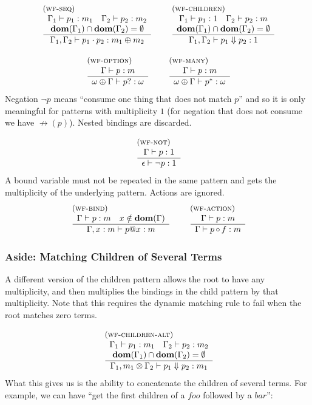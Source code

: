 \documentclass{article}
\makeatletter
\newcommand{\rulename}{\textsc}
\newcommand{\irule}[3]{\begin{array}{l}{~\small\mbox{(\rulename{#1})}}\\\;\frac{\begin{array}{c}#2\end{array}}{\begin{array}{l}#3\end{array}}\end{array}}
\newcommand{\wfp}[3]{\ensuremath{#1 \vdash #2 : #3}}
\newcommand{\pseq}[2]{\ensuremath{#1 \cdot #2}}
\newcommand{\children}[2]{\ensuremath{#1} \Downarrow #2}
\newcommand{\pnot}[1]{\ensuremath{\lnot #1}}
\newcommand{\maybe}[1]{\ensuremath{#1?}}
\newcommand{\many}[1]{\ensuremath{#1^*}}
\newcommand{\bind}[2]{\ensuremath{#1@#2}}
\newcommand{\paction}[2]{\ensuremath{#1\mathop{\circ} #2}}
\newcommand{\nfb}[1]{\ensuremath{\mathop{\not\rightarrow}(#1)}}
\makeatother
\begin{document}
\[
  \begin{array}{c}
    \irule{wf-seq}{
    \wfp{\Gamma_1}{p_1}{m_1}\quad
    \wfp{\Gamma_2}{p_2}{m_2}\\
    \mathbf{dom}(\Gamma_1) \cap \mathbf{dom}(\Gamma_2) = \emptyset
    }{
    \wfp{\Gamma_1, \Gamma_2}{\pseq{p_1}{p_2}}{m_1\oplus m_2}
    }
    \quad
    \irule{wf-children}{
    \wfp{\Gamma_1}{p_1}{1}
    \quad
    \wfp{\Gamma_2}{p_2}{m}\\
    \mathbf{dom}(\Gamma_1) \cap \mathbf{dom}(\Gamma_2) = \emptyset
    }{
    \wfp{\Gamma_1, \Gamma_2}{\children{p_1}{p_2}}{1}
    }
    \\\\
    \irule{wf-option}{
    \wfp{\Gamma}{p}{m}
    }{
    \wfp{\omega \oplus \Gamma}{\maybe{p}}{\omega}
    }
    \quad
    \irule{wf-many}{
    \wfp{\Gamma}{p}{m}
    }{
    \wfp{\omega \oplus \Gamma}{\many{p}}{\omega}
    }
  \end{array}
\]
%
Negation \pnot{p} means ``consume one thing that does not match
$p$'' and so it is only meaningful for patterns with multiplicity
$1$ (for negation that does not consume we have \nfb{p}). Nested
bindings are discarded.

\[
  \begin{array}{c}
    \irule{wf-not}{
    \wfp{\Gamma}{p}{1}
    }{
    \wfp{\epsilon}{\pnot{p}}{1}
    }
  \end{array}
\]
%
A bound variable must not be repeated in the same pattern and gets
the multiplicity of the underlying pattern. Actions are ignored.
\[
  \begin{array}{c}
    \irule{wf-bind}{
    \wfp{\Gamma}{p}{m}
    \quad
    x \notin{\mathbf{dom}(\Gamma)}
    }{
    \wfp{\Gamma, x : m}{\bind{p}{x}}{m}
    }
    \quad
    \irule{wf-action}{
    \wfp{\Gamma}{p}{m}
    }{
    \wfp{\Gamma}{\paction{p}{f}}{m}
    }
  \end{array}
\]


\subsubsection{Aside: Matching Children of Several Terms}

A different version of the children pattern allows the root to
have any multiplicity, and then multiplies the bindings in the
child pattern by that multiplicity. Note that this requires the
dynamic matching rule to fail when the root matches zero terms.

\[
  \begin{array}{c}
    \irule{wf-children-alt}{
    \wfp{\Gamma_1}{p_1}{m_1}
    \quad
    \wfp{\Gamma_2}{p_2}{m_2}\\
    \mathbf{dom}(\Gamma_1) \cap \mathbf{dom}(\Gamma_2) = \emptyset
    }{
    \wfp{\Gamma_1, m_1 \otimes \Gamma_2}{\children{p_1}{p_2}}{m_1}
    }
  \end{array}
\]
%
What this gives us is the ability to concatenate the children of
several terms. For example, we can have ``get the first children
of a $\mathit{foo}$ followed by a $\mathit{bar}$'':
\end{document}
